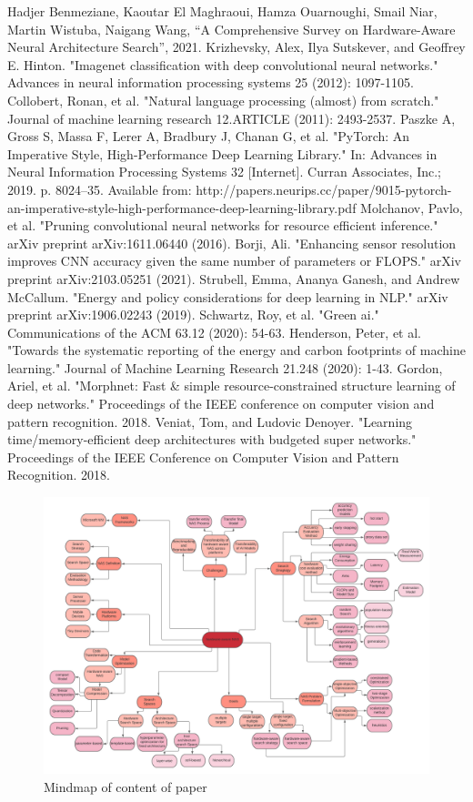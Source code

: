 \documentclass[conference]{IEEEtran}
\begin{document}
\begin{thebibliography}{00}
 Hadjer Benmeziane, Kaoutar El Maghraoui, Hamza Ouarnoughi, Smail Niar, Martin Wistuba, Naigang Wang, ``A Comprehensive Survey on Hardware-Aware Neural Architecture Search'', 2021.
 Krizhevsky, Alex, Ilya Sutskever, and Geoffrey E. Hinton. "Imagenet classification with deep convolutional neural networks." Advances in neural information processing systems 25 (2012): 1097-1105.
 Collobert, Ronan, et al. "Natural language processing (almost) from scratch." Journal of machine learning research 12.ARTICLE (2011): 2493-2537.
 Paszke A, Gross S, Massa F, Lerer A, Bradbury J, Chanan G, et al. "PyTorch: An Imperative Style, High-Performance Deep Learning Library." In: Advances in Neural Information Processing Systems 32 [Internet]. Curran Associates, Inc.; 2019. p. 8024–35. Available from: http://papers.neurips.cc/paper/9015-pytorch-an-imperative-style-high-performance-deep-learning-library.pdf
 Molchanov, Pavlo, et al. "Pruning convolutional neural networks for resource efficient inference." arXiv preprint arXiv:1611.06440 (2016).
 Borji, Ali. "Enhancing sensor resolution improves CNN accuracy given the same number of parameters or FLOPS." arXiv preprint arXiv:2103.05251 (2021).
 Strubell, Emma, Ananya Ganesh, and Andrew McCallum. "Energy and policy considerations for deep learning in NLP." arXiv preprint arXiv:1906.02243 (2019).
 Schwartz, Roy, et al. "Green ai." Communications of the ACM 63.12 (2020): 54-63.
 Henderson, Peter, et al. "Towards the systematic reporting of the energy and carbon footprints of machine learning." Journal of Machine Learning Research 21.248 (2020): 1-43.
 Gordon, Ariel, et al. "Morphnet: Fast \& simple resource-constrained structure learning of deep networks." Proceedings of the IEEE conference on computer vision and pattern recognition. 2018.
 Veniat, Tom, and Ludovic Denoyer. "Learning time/memory-efficient deep architectures with budgeted super networks." Proceedings of the IEEE Conference on Computer Vision and Pattern Recognition. 2018.
\end{thebibliography}

\begin{figure}[htbp]
\includegraphics[width=\paperwidth, angle =90]{harware-awareNAS.png}
\caption{Mindmap of content of paper}
\label{fig:Mindmap}
\end{figure} 
\end{document}
